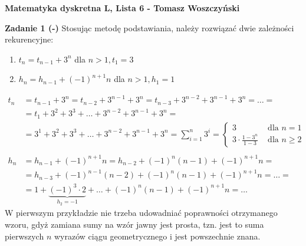 \documentclass[a4paper,12pt]{article}
\begin{document}
\noindent \textbf{Matematyka dyskretna L, Lista 6 - Tomasz Woszczyński}\newline

\noindent \newline \textbf{Zadanie 1 (-)} \newline
Stosując metodę podstawiania, należy rozwiązać dwie zależności rekurencyjne:
\begin{enumerate}
	\item $t_n = t_{n-1} + 3^n$ dla $n > 1, t_1 = 3$
	\item $h_n = h_{n-1} + (-1)^{n+1}n$ dla $n > 1, h_1 = 1$
\end{enumerate}
\begin{align*}
	t_n &= t_{n-1} + 3^n = t_{n-2} + 3^{n-1} + 3^n = t_{n-3} + 3^{n-2} + 3^{n-1} + 3^n = \ldots = \\[10pt] %
		&= t_1 + 3^2 + 3^3 + \ldots + 3^{n-2} + 3^{n-1} + 3^n = \\[0pt]
		&= 3^1 + 3^2 + 3^3 + \ldots + 3^{n-2} + 3^{n-1} + 3^n = \sum\limits_{i=1}^{n} 3^i = 
		\begin{cases}
			3 								&\text{ dla } n = 1 \\
			3 \cdot \frac{1 - 3^n}{1 - 3} 	&\text{ dla } n \geq 2
		\end{cases} \\ \\ 
	h_n &= h_{n-1} + (-1)^{n+1}n = h_{n-2} + (-1)^n (n-1) + (-1)^{n+1}n = \\
		&= h_{n-3} + (-1)^{n-1}(n-2) + (-1)^n (n-1) + (-1)^{n+1}n = \ldots = \\
		&= 1 + \underbrace{(-1)^{3}\cdot 2}_{h_2 = -1} +  \ldots + (-1)^n (n-1) + (-1)^{n+1}n = \ldots
\end{align*}
\noindent W pierwszym przykładzie nie trzeba udowadniać poprawności otrzymanego wzoru, gdyż zamiana sumy na wzór jawny jest prosta, tzn. jest to suma pierwszych $n$ wyrazów ciągu geometrycznego i jest powszechnie znana. \\
\end{document}
